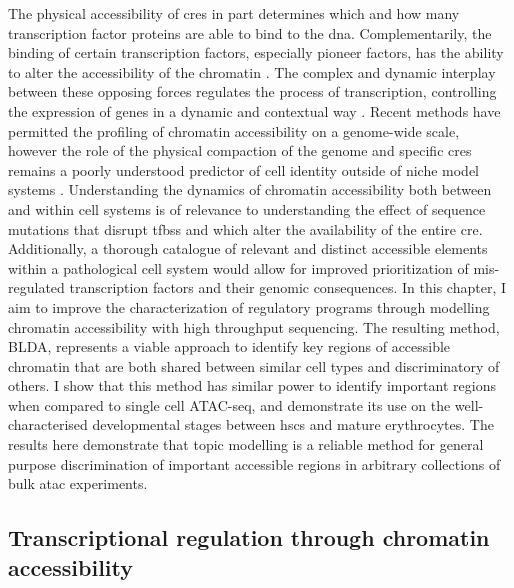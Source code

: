 The physical accessibility of \Glspl{cre} in part determines which and how many transcription factor proteins are able to bind to the \gls{dna}. Complementarily, the binding of certain transcription factors, especially pioneer factors, has the ability to alter the accessibility of the chromatin \cite{Zaret2011}. The complex and dynamic interplay between these opposing forces regulates the process of transcription, controlling the expression of genes in a dynamic and contextual way \cite{Minnoye2021, Klemm}. Recent methods have permitted the profiling of chromatin accessibility on a genome-wide scale, however the role of the physical compaction of the genome and specific \glspl{cre} remains a poorly understood predictor of cell identity outside of niche model systems \cite{Schulz2019}. Understanding the dynamics of chromatin accessibility both between and within cell systems is of relevance to understanding the effect of sequence mutations that disrupt \glspl{tfbs} and which alter the availability of the entire \gls{cre}. Additionally, a thorough catalogue of relevant and distinct accessible elements within a pathological cell system would allow for improved prioritization of mis-regulated transcription factors and their genomic consequences. In this chapter, I aim to improve the characterization of regulatory programs through modelling chromatin accessibility with high throughput sequencing. The resulting method, BLDA, represents a viable approach to identify key regions of accessible chromatin that are both shared between similar cell types and discriminatory of others. I show that this method has similar power to identify important regions when compared to single cell ATAC-seq, and demonstrate its use on the well-characterised developmental stages between \glspl{hsc} and mature erythrocytes. The results here demonstrate that topic modelling is a reliable method for general purpose discrimination of important accessible regions in arbitrary collections of bulk \gls{atac} experiments.

\subsection{Transcriptional regulation through chromatin accessibility} \label{ch3:chrom_acc}

